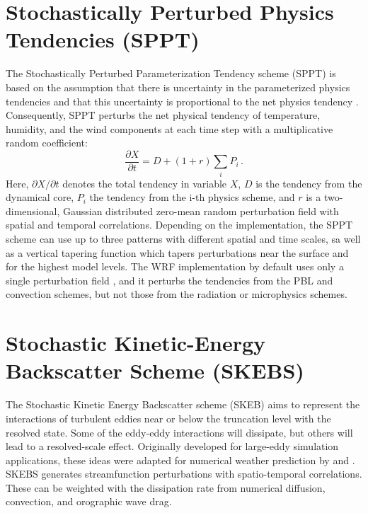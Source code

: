\section {Stochastically Perturbed Physics Tendencies (SPPT)}
The Stochastically Perturbed Parameterization Tendency scheme
(SPPT) is based on the assumption that there is uncertainty
in the parameterized physics tendencies and that this 
uncertainty is proportional to the net physics tendency \citep{Bu99,Pa09}.
Consequently, SPPT perturbs the net physical tendency of temperature, 
humidity, and the wind components at each time step with a multiplicative 
random coefficient:
\begin{equation}
   \frac{\partial X}{\partial t}= D + (1+ r) \sum_i P_i \,.
\end{equation}
Here, ${\partial X}/{\partial t}$ denotes the total tendency in variable $X$, 
$D$ is the tendency from the dynamical core, 
$P_i$ the tendency from the i-th physics scheme, 
and $r$ is a two-dimensional, Gaussian distributed zero-mean random
perturbation field with spatial and temporal correlations. 
Depending on
the implementation, the SPPT scheme can use up to three patterns with
different spatial and time scales, sa well as a vertical tapering function which 
tapers perturbations near the surface and for the highest model levels.
The WRF implementation by default uses only a single perturbation field \citep{Be15},
and it perturbs the tendencies from the PBL and convection schemes, but not those from 
the radiation or microphysics schemes.

\section{Stochastic Kinetic-Energy Backscatter Scheme (SKEBS)}
The Stochastic Kinetic Energy Backscatter scheme (SKEB) aims to represent
the interactions of turbulent eddies near or below the
truncation level with the resolved state. Some of the eddy-eddy interactions
will dissipate, but others will lead to a resolved-scale effect.
Originally developed for large-eddy simulation applications, these ideas were 
adapted for numerical weather prediction by
\citet{Sh05} and \citet{Be09}.
SKEBS generates streamfunction perturbations with spatio-temporal correlations. These
can be weighted with the dissipation rate from numerical diffusion, 
convection, and orographic wave drag. 

